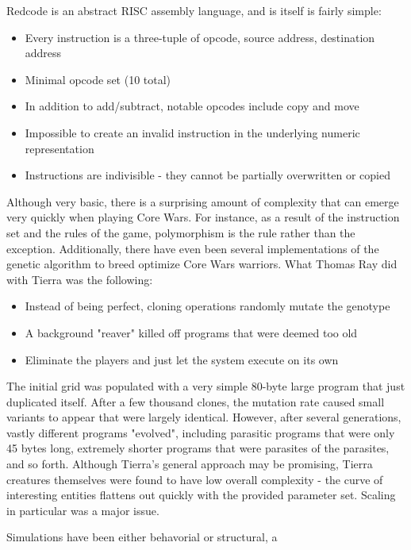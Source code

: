 \documentclass{article}
\begin{document}
Redcode is an abstract RISC assembly language, and is itself is fairly simple:

\begin{itemize}
\item Every instruction is a three-tuple of opcode, source address, destination address
\item Minimal opcode set (10 total)
\item In addition to add/subtract, notable opcodes include copy and move
\item Impossible to create an invalid instruction in the underlying numeric representation
\item Instructions are indivisible - they cannot be partially overwritten or copied
\end{itemize}

	Although very basic, there is a surprising amount of complexity that can emerge very quickly when playing Core Wars. For instance, as a result of the instruction set and the rules of the game, polymorphism is the rule rather than the exception. Additionally, there have even been several implementations of the genetic algorithm to breed optimize Core Wars warriors. What Thomas Ray did with Tierra was the following: 

\begin{itemize}
\item Instead of being perfect, cloning operations randomly mutate the genotype
\item A background "reaver" killed off programs that were deemed too old
\item Eliminate the players and just let the system execute on its own
\end{itemize}

The initial grid was populated with a very simple 80-byte large program that just duplicated itself. After a few thousand clones, the mutation rate caused small variants to appear that were largely identical.
However, after several generations, vastly different programs "evolved", including parasitic programs that were only 45 bytes long, extremely shorter programs that were parasites of the parasites, and so forth.
Although Tierra's general approach may be promising, Tierra creatures themselves were found to have low overall complexity - the curve of interesting entities flattens out quickly with the provided parameter set. Scaling in particular was a major issue.



Simulations have been either behavorial or structural, a
\end{document}
